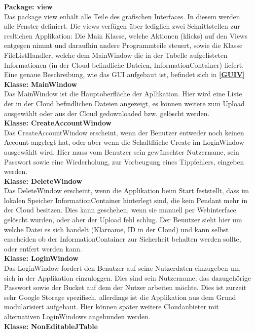\documentclass[12pt,a4paper,bibliography=totocnumbered,listof=totocnumbered]{scrartcl}
\newcommand*{\fullref}[1]{\textbf{\hyperref[{#1}]{\ref*{#1} \nameref*{#1}}}}
\begin{document}
\textbf{Package: view}\\
Das package view enhält alle Teile des grafischen Interfaces. In diesem werden alle Fenster definiert. Die views verfügen über lediglich zwei Schnittstellen zur resltichen Applikation: Die Main Klasse, welche Aktionen (klicks) auf den Views entgegen nimmt und daraufhin andere Programmteile steuert, sowie die Klasse FileListHandler, welche dem MainWindow die in der Tabelle aufgelisteten Informationen (in der Cloud befindliche Dateien, InformationContainer) liefert. Eine genaue Beschreibung, wie das GUI aufgebaut ist, befindet sich in \fullref{GUIV}\\
\textbf{Klasse: MainWindow}\\
Das MainWindow ist die Hauptoberfläche der Apllikation. Hier wird eine Liste der in der Cloud befindlichen Dateien angezeigt, es können weitere zum Upload ausgewählt oder aus der Cloud gedownloaded bzw. gelöscht werden.\\
\textbf{Klasse: CreateAccountWindow}\\
Das CreateAccountWindow erscheint, wenn der Benutzer entweder noch keinen Account angelegt hat, oder aber wenn die Schaltfläche Create im LoginWindow ausgewählt wird. Hier muss vom Benutzer sein gewünschter Nutzername, sein Passwort sowie eine Wiederholung, zur Vorbeugung eines Tippfehlers, eingeben werden.\\
\textbf{Klasse: DeleteWindow}\\
Das DeleteWindow erscheint, wenn die Applikation beim Start feststellt, dass im lokalen Speicher InformationContainer hinterlegt sind, die kein Pendant mehr in der Cloud besitzen. Dies kann geschehen, wenn sie manuell per Webinterface gelöscht wurden, oder aber der Upload fehl schlug. Der Benutzer sieht hier um welche Datei es sich handelt (Klarname, ID in der Cloud) und kann selbst enscheiden ob der InformationContainer zur Sicherheit behalten werden sollte, oder entfert werden kann.\\
\textbf{Klasse: LoginWindow}\\
Das LoginWindow fordert den Benutzer auf seine Nutzerdaten einzugeben um sich in der Applikation einzuloggen. Dies sind sein Nutzername, das dazugehörige Passwort sowie der Bucket auf dem der Nutzer arbeiten möchte. Dies ist zurzeit sehr Google Storage spezifisch, allerdings ist die Applikation aus dem Grund modularisiert aufgebaut. Hier können später weitere Cloudanbieter mit alternativen LoginWindows angebunden werden.\\
\textbf{Klasse: NonEditableJTable}\\
\end{document}
